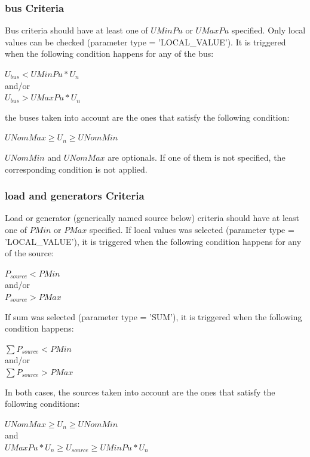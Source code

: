 \documentclass[a4paper, 12pt]{report}
\begin{document}
\subsubsection{bus Criteria}

Bus criteria should have at least one of $UMinPu$ or $UMaxPu$ specified. Only
local values can be checked (parameter type = 'LOCAL\_VALUE').
It is triggered when the following condition happens for any of the bus: \\
\begin{center}
$U_{bus} < UMinPu*U_n$\\
and/or\\
$U_{bus} > UMaxPu*U_n$ \\
\end{center}
the buses taken into account are the ones that satisfy the
following condition:
\begin{center}
$UNomMax \ge U_n \ge UNomMin$\\
\end{center}

$UNomMin$ and $UNomMax$ are optionals. If one of them is not
specified, the corresponding condition is not applied.

\subsubsection{load and generators Criteria}

Load or generator (generically named source below) criteria should have at least
one of $PMin$ or $PMax$ specified.
If local values was selected  (parameter type = 'LOCAL\_VALUE'), it is triggered when
the following condition happens for any of the source:\\
\begin{center}
$P_{source} < PMin$\\
and/or\\
$P_{source} > PMax$\\
\end{center}
If sum was selected  (parameter type = 'SUM'), it is triggered when the
following condition happens: \\
\begin{center}
$\sum P_{source} < PMin$\\
and/or\\
$\sum P_{source} > PMax$ \\
\end{center}
In both cases, the sources taken into account are the ones that satisfy the
following conditions:\\
\begin{center}
$UNomMax \ge U_n \ge UNomMin$\\
and\\
$UMaxPu*U_n \ge U_{source} \ge UMinPu*U_n$ \\
\end{center}
\end{document}
